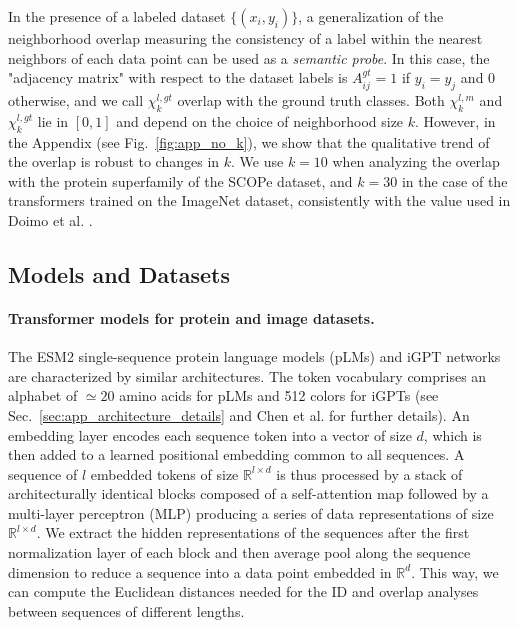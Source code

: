 \documentclass{article}
\begin{document}
In the presence of a labeled dataset $\{(x_i,y_i)\}$, a generalization of the neighborhood overlap measuring the consistency of a label within the nearest neighbors of each data point can be used as a \emph{semantic probe}. In this case, the "adjacency matrix" with respect to the dataset labels is $A^{gt}_{{ij}} =1$ if $y_i = y_j  $ and $0$ otherwise, and we call $\chi_k^{l,gt}$ overlap with the ground truth classes.
%
Both $\chi_k^{l,m}$ and $\chi_k^{l,gt}$ lie in $[0, 1]$ and depend on the choice of neighborhood size $k$. However, in the Appendix (see Fig.~\ref{fig:app_no_k}), we show that the qualitative trend of the overlap is robust to changes in $k$. 
%
We use $k=10$ when analyzing the overlap with the protein superfamily of the SCOPe dataset, and $k=30$ in the case of the transformers trained on the ImageNet dataset, consistently with the value used in Doimo et al. \cite{doimo2020hierarchical}.  

\subsection{Models and Datasets}
\label{sec:models_dataset}

\paragraph{Transformer models for protein and image datasets.} The ESM2 single-sequence protein language models (pLMs) and iGPT networks are characterized by similar architectures. 
%
The token vocabulary comprises an alphabet of $\simeq 20$ amino acids for pLMs and 512 colors for iGPTs  (see Sec.~\ref{sec:app_architecture_details} and Chen et al. \cite{igpt} for further details).
%
An embedding layer encodes each sequence token into a vector of size $d$, which is then added to a learned positional embedding common to all sequences. 
%
A sequence of $l$ embedded tokens of size $\mathbb{R}^{l \times d}$ is thus processed by a stack of architecturally identical blocks composed of a self-attention map followed by a multi-layer perceptron (MLP) producing a series of data representations of size $\mathbb{R}^{l \times d}$.
%
We extract the hidden representations of the sequences after the first normalization layer of each block and then average pool along the sequence dimension to reduce a sequence into a data point embedded in $\mathbb{R}^{d}$.
%
This way, we can compute the Euclidean distances needed for the ID and overlap analyses between sequences of different lengths.
%
\end{document}
